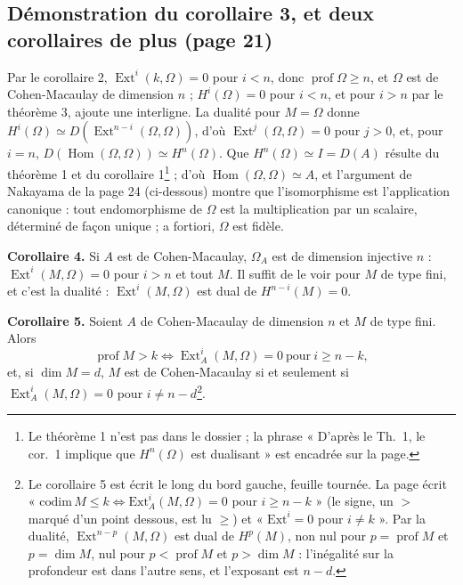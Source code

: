 \documentclass[11pt,a4paper]{article}
\begin{document}
\subsection*{Démonstration du corollaire 3, et deux corollaires de plus (page 21)}

Par le corollaire 2, $\operatorname{Ext}^i(k, \Omega) = 0$ pour $i < n$, donc
$\operatorname{prof} \Omega \geqslant n$, et $\Omega$ est de Cohen-Macaulay de
dimension $n$ ; $H^i(\Omega) = 0$ pour $i < n$, et pour $i > n$ par le
théorème 3, ajoute une interligne. La dualité pour $M = \Omega$
donne $H^i(\Omega) \simeq D(\operatorname{Ext}^{n-i}(\Omega, \Omega))$, d'où
$\operatorname{Ext}^{j}(\Omega, \Omega) = 0$ pour $j > 0$, et, pour $i = n$,
$D(\operatorname{Hom}(\Omega, \Omega)) \simeq H^n(\Omega)$. Que $H^n(\Omega)
\simeq I = D(A)$ résulte du théorème 1 et du corollaire 1\footnote{Le théorème 1
n'est pas dans le dossier ; la phrase « D'après le Th.\ 1, le cor.\ 1 implique
que $H^n(\Omega)$ est dualisant » est encadrée sur la page.} ; d'où
$\operatorname{Hom}(\Omega, \Omega) \simeq A$, et l'argument de Nakayama de la
page 24 (ci-dessous) montre que l'isomorphisme est l'application canonique : tout
endomorphisme de $\Omega$ est la multiplication par un scalaire, déterminé de
façon unique ; a fortiori, $\Omega$ est fidèle.

\textbf{Corollaire 4.} Si $A$ est de Cohen-Macaulay, $\Omega_A$ est de dimension
injective $n$ : $\operatorname{Ext}^i(M, \Omega) = 0$ pour $i > n$ et tout $M$.
Il suffit de le voir pour $M$ de type fini, et c'est la dualité :
$\operatorname{Ext}^i(M, \Omega)$ est dual de $H^{n-i}(M) = 0$.

\textbf{Corollaire 5.} Soient $A$ de Cohen-Macaulay de dimension $n$ et $M$ de
type fini. Alors
\[
  \operatorname{prof} M > k \iff \operatorname{Ext}^i_A(M, \Omega) = 0 \ \text{pour}\
  i \geqslant n - k,
\]
et, si $\dim M = d$, $M$ est de Cohen-Macaulay si et seulement si
$\operatorname{Ext}^i_A(M, \Omega) = 0$ pour $i \neq n - d$\footnote{Le
corollaire 5 est écrit le long du bord gauche, feuille tournée. La page écrit
« $\mathrm{codim}\, M \leq k \Leftrightarrow \mathrm{Ext}^i_A(M, \Omega) = 0$
pour $i \geq n - k$ » (le signe, un $>$ marqué d'un point dessous, est lu $\geq$) et « $\mathrm{Ext}^i = 0$
pour $i \neq k$ ». Par la dualité, $\operatorname{Ext}^{n-p}(M, \Omega)$ est dual
de $H^p(M)$, non nul pour $p = \operatorname{prof} M$ et $p = \dim M$, nul pour
$p < \operatorname{prof} M$ et $p > \dim M$ : l'inégalité sur la profondeur est
dans l'autre sens, et l'exposant est $n - d$.}.
\end{document}
